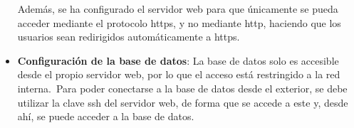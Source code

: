 \begin{itemize}
	Además, se ha configurado el servidor web para que únicamente se pueda acceder mediante el protocolo
	https, y no mediante http, haciendo que los usuarios sean redirigidos automáticamente a https.

	\item \textbf{Configuración de la base de datos}: La base de datos solo es accesible desde el propio servidor web,
	por lo que el acceso está restringido a la red interna.\ Para poder conectarse a la base de datos desde el
	exterior, se debe utilizar la clave ssh del servidor web, de forma que se accede a este y, desde ahí, se
	puede acceder a la base de datos.
\end{itemize}
